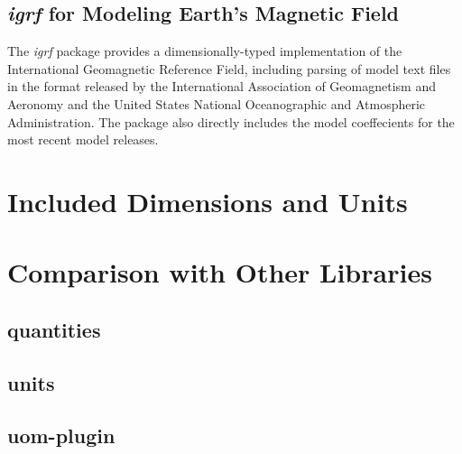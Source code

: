 \documentclass[12pt]{report}
\newcommand{\packagename}[1]{\textit{#1}}
\begin{document}
\section{\packagename{igrf} for Modeling Earth's Magnetic Field}

The \packagename{igrf} package provides a dimensionally-typed implementation of the International Geomagnetic
Reference Field, including parsing of model text files in the format released by the International Association of
Geomagnetism and Aeronomy and the United States National Oceanographic and Atmospheric Administration. The
package also directly includes the model coeffecients for the most recent model releases.

\chapter{Included Dimensions and Units}

\chapter{Comparison with Other Libraries}

\section{quantities}
\section{units}
\section{uom-plugin}
\end{document}
